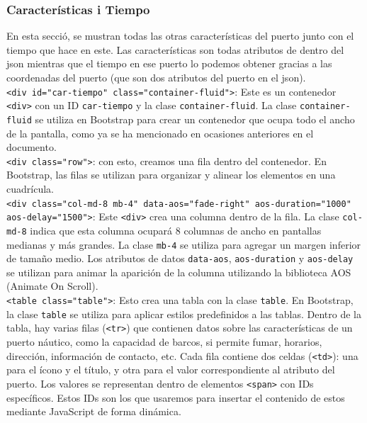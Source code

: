 \documentclass{article}
\begin{document}
\subsubsection{Características i Tiempo}
En esta secció, se mustran todas las otras características del puerto junto con el tiempo que hace en este. Las características son todas atributos de dentro del json mientras que el tiempo en ese puerto lo podemos obtener gracias a las coordenadas del puerto (que son dos atributos del puerto en el json).\\ 

\noindent\texttt{<div id="car-tiempo" class="container-fluid">}: Este es un contenedor \texttt{<div>} con un ID \texttt{car-tiempo} y la clase \texttt{container-fluid}. La clase \texttt{container-fluid} se utiliza en Bootstrap para crear un contenedor que ocupa todo el ancho de la pantalla, como ya se ha mencionado en ocasiones anteriores en el documento.\\

\noindent\texttt{<div class="row">}: con esto, creamos una fila dentro del contenedor. En Bootstrap, las filas se utilizan para organizar y alinear los elementos en una cuadrícula.\\

\noindent\texttt{<div class="col-md-8 mb-4" data-aos="fade-right" aos-duration="1000" aos-delay="1500">}: Este \texttt{<div>} crea una columna dentro de la fila. La clase \texttt{col-md-8} indica que esta columna ocupará 8 columnas de ancho en pantallas medianas y más grandes. La clase \texttt{mb-4} se utiliza para agregar un margen inferior de tamaño medio. Los atributos de datos \texttt{data-aos}, \texttt{aos-duration} y \texttt{aos-delay} se utilizan para animar la aparición de la columna utilizando la biblioteca AOS (Animate On Scroll).\\

\noindent\texttt{<table class="table">}: Esto crea una tabla con la clase \texttt{table}. En Bootstrap, la clase \texttt{table} se utiliza para aplicar estilos predefinidos a las tablas. Dentro de la tabla, hay varias filas (\texttt{<tr>}) que contienen datos sobre las características de un puerto náutico, como la capacidad de barcos, si permite fumar, horarios, dirección, información de contacto, etc. Cada fila contiene dos celdas (\texttt{<td>}): una para el ícono y el título, y otra para el valor correspondiente al atributo del puerto. Los valores se representan dentro de elementos \texttt{<span>} con IDs específicos. Estos IDs son los que usaremos para insertar el contenido de estos mediante JavaScript de forma dinámica.\\
\end{document}
